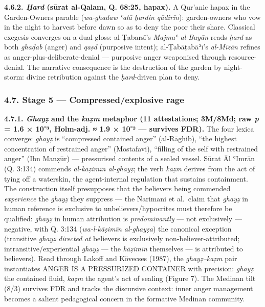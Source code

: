 \textbf{4.6.2. \emph{Ḥard} (sūrat al-Qalam, Q. 68:25, hapax).} A
Qur'anic hapax in the Garden-Owners parable (\emph{wa-ghadaw ʿalā ḥardin
qādirīn}): garden-owners who vow in the night to harvest before dawn so
as to deny the poor their share. Classical exegesis converges on a dual
gloss: al-Ṭabarsī's \emph{Majmaʿ al-Bayān} reads \emph{ḥard} as both
\emph{ghaḍab} (anger) and \emph{qaṣd} (purposive intent);
al-Ṭabāṭabāʾī's \emph{al-Mīzān} refines as anger-plus-deliberate-denial
--- purposive anger weaponised through resource-denial. The narrative
consequence is the destruction of the garden by night-storm: divine
retribution against the \emph{ḥard}-driven plan to deny.

\subsubsection{4.7. Stage 5 --- Compressed/explosive
rage}\label{stage-5-compressedexplosive-rage}

\textbf{4.7.1. \emph{Ghayẓ} and the \emph{kaẓm} metaphor (11
attestations; 3M/8Md; raw \emph{p} = 1.6 × 10⁻³, Holm-adj. ≈ 1.9 × 10⁻²
--- survives FDR).} The four lexica converge: \emph{ghayẓ} is
``compressed contained anger'' (al-Rāghib), ``the highest concentration
of restrained anger'' (Mostafavi), ``filling of the self with restrained
anger'' (Ibn Manẓūr) --- pressurised contents of a sealed vessel. Sūrat
Āl ʿImrān (Q. 3:134) commends \emph{al-kāẓimīn al-ghayẓ}; the verb
\emph{kaẓm} derives from the act of tying off a waterskin, the
agent-internal regulation that sustains containment. The construction
itself presupposes that the believers being commended \emph{experience}
the \emph{ghayẓ} they suppress --- the Narimani et al.~claim that
\emph{ghayẓ} in human reference is exclusive to unbelievers/hypocrites
must therefore be qualified: \emph{ghayẓ} in human attribution is
\emph{predominantly} --- not exclusively --- negative, with Q. 3:134
(\emph{wa-l-kāẓimīn al-ghayẓa}) the canonical exception (transitive
\emph{ghayẓ directed at} believers is exclusively
non-believer-attributed; intransitive/experiential \emph{ghayẓ} --- the
\emph{kāẓimīn} themselves --- is attributed to believers). Read through
Lakoff and Kövecses (1987), the \emph{ghayẓ--kaẓm} pair instantiates
ANGER IS A PRESSURIZED CONTAINER with precision: \emph{ghayẓ} the
contained fluid, \emph{kaẓm} the agent's act of sealing (Figure 7). The
Medinan tilt (8/3) survives FDR and tracks the discursive context: inner
anger management becomes a salient pedagogical concern in the formative
Medinan community.

